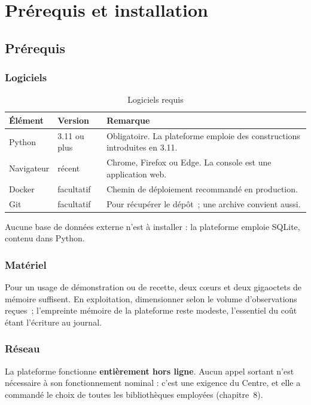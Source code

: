 \chapter{Prérequis et installation}
\minitoc

\section{Prérequis}

\subsection{Logiciels}

\begin{table}[h]
\centering
\begin{tabular}{@{}p{4cm}p{3cm}p{6cm}@{}}
\toprule
\textbf{Élément} & \textbf{Version} & \textbf{Remarque} \\
\midrule
Python & 3.11 ou plus & Obligatoire. La plateforme emploie des
constructions introduites en 3.11. \\[6pt]
Navigateur & récent & Chrome, Firefox ou Edge. La console est une
application web. \\[6pt]
Docker & facultatif & Chemin de déploiement recommandé en production. \\[6pt]
Git & facultatif & Pour récupérer le dépôt~; une archive convient aussi. \\
\bottomrule
\end{tabular}
\caption{Logiciels requis}
\end{table}

Aucune base de données externe n'est à installer : la plateforme emploie
SQLite, contenu dans Python.

\subsection{Matériel}

Pour un usage de démonstration ou de recette, deux cœurs et deux gigaoctets de
mémoire suffisent. En exploitation, dimensionner selon le volume d'observations
reçues~; l'empreinte mémoire de la plateforme reste modeste, l'essentiel du
coût étant l'écriture au journal.

\subsection{Réseau}

La plateforme fonctionne \textbf{entièrement hors ligne}. Aucun appel sortant
n'est nécessaire à son fonctionnement nominal : c'est une exigence du Centre,
et elle a commandé le choix de toutes les bibliothèques employées
(chapitre~8).

